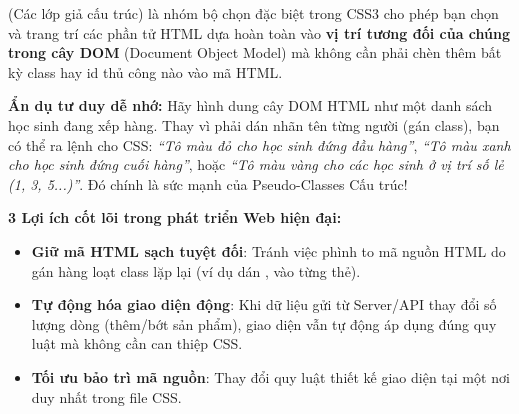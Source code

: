 \begin{conceptBox}
 (Các lớp giả cấu trúc) là nhóm bộ chọn đặc biệt trong CSS3 cho phép bạn chọn và trang trí các phần tử HTML dựa hoàn toàn vào \textbf{vị trí tương đối của chúng trong cây DOM} (Document Object Model) mà không cần phải chèn thêm bất kỳ class hay id thủ công nào vào mã HTML.

\par\vspace{4pt}
\textbf{ Ẩn dụ tư duy dễ nhớ:} Hãy hình dung cây DOM HTML như một danh sách học sinh đang xếp hàng. Thay vì phải dán nhãn tên từng người (gán class), bạn có thể ra lệnh cho CSS: \textit{``Tô màu đỏ cho học sinh đứng đầu hàng''}, \textit{``Tô màu xanh cho học sinh đứng cuối hàng''}, hoặc \textit{``Tô màu vàng cho các học sinh ở vị trí số lẻ (1, 3, 5...)''}. Đó chính là sức mạnh của Pseudo-Classes Cấu trúc!

\par\vspace{4pt}
\textbf{ 3 Lợi ích cốt lõi trong phát triển Web hiện đại:}
\begin{itemize}[leftmargin=1.5em, itemsep=3pt, parsep=0pt]
    \item \textbf{Giữ mã HTML sạch tuyệt đối}: Tránh việc phình to mã nguồn HTML do gán hàng loạt class lặp lại (ví dụ dán ,  vào từng thẻ).
    \item \textbf{Tự động hóa giao diện động}: Khi dữ liệu gửi từ Server/API thay đổi số lượng dòng (thêm/bớt sản phẩm), giao diện vẫn tự động áp dụng đúng quy luật mà không cần can thiệp CSS.
    \item \textbf{Tối ưu bảo trì mã nguồn}: Thay đổi quy luật thiết kế giao diện tại một nơi duy nhất trong file CSS.
\end{itemize}
\end{conceptBox}

